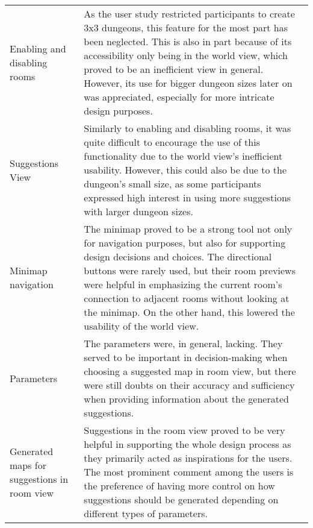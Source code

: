 \begin{table*}[ht]
{\begin{tabularx}{\textwidth}{|p{}|p{}|}
Enabling and  \newline disabling rooms                & As the user study restricted participants to create 3x3 dungeons, this feature for the most part has been neglected. This is also in part because of its accessibility only being in the world view, which proved to be an inefficient view in general. However, its use for bigger dungeon sizes later on was appreciated, especially for more intricate design purposes.                                                      \\\cline{1-2}
Suggestions View                            & Similarly to enabling and disabling rooms, it was quite difficult to encourage the use of this functionality due to the world view’s inefficient usability. However, this could also be due to the dungeon’s small size, as some participants expressed high interest in using more suggestions with larger dungeon sizes.                                                                                                      \\\cline{1-2}
Minimap  \newline  navigation                      & The minimap proved to be a strong tool not only for navigation purposes, but also for supporting design decisions and choices. The directional buttons were rarely used, but their room previews were helpful in emphasizing the current room’s connection to adjacent rooms without looking at the minimap. On the other hand, this lowered the usability of the world view.                                                   \\\cline{1-2}
Parameters                                       & The parameters were, in general, lacking. They served to be important in decision-making when choosing a suggested map in room view, but there were still doubts on their accuracy and sufficiency when providing information about the generated suggestions.                                                                                                                                                                       \\\cline{1-2}
Generated maps for  \newline  suggestions in room view & Suggestions in the room view proved to be very helpful in supporting the whole design process as they primarily acted as inspirations for the users. The most prominent comment among the users is the preference of having more control on how suggestions should be generated depending on different types of parameters.                                                                                                     \\\cline{1-2}

\end{tabularx}}
\end{table*}
